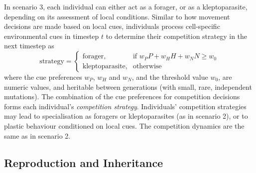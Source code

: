 In scenario 3, each individual can either act as a forager, or as a kleptoparasite, depending on its assessment of local conditions.
Similar to how movement decisions are made based on local cues, individuals process cell-specific environmental cues in timestep $t$ to determine their competition strategy in the next timestep as
\begin{equation}
    \text{strategy} = 
\begin{cases}
    \text{forager},& \text{if } w_PP + w_HH + w_NN \geq w_0\\
    \text{kleptoparasite},              & \text{otherwise}
\end{cases}
\end{equation}  
where the cue preferences $w_P$, $w_H$ and $w_N$, and the threshold value $w_0$, are numeric values, and heritable between generations (with small, rare, independent mutations).
The combination of the cue preferences for competition decisions forms each individual's \textit{competition strategy}.
Individuals' competition strategies may lead to specialisation as foragers or kleptoparasites (as in scenario 2), or to plastic behaviour conditioned on local cues.
The competition dynamics are the same as in scenario 2.

\subsection*{Reproduction and Inheritance}

